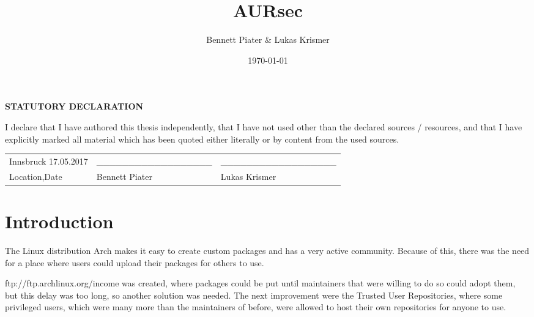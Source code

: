 \documentclass{scrartcl}
\title{AURsec}
\author{Bennett Piater \& Lukas Krismer}
\date{\today}
\begin{document}
  \thispagestyle{empty}

  


  \vspace*{\fill}
  \begin{center} \textbf{\large{STATUTORY DECLARATION}} \end{center}
  I declare that I have authored this thesis independently, that I have not used other than the declared sources  /  resources,  and  that  I  have  explicitly  marked  all  material  which  has  been  quoted  either literally or by content from the used sources. 

  \begin{center} 
  \begin{table}[!htb]
  \begin{tabularx}{\textwidth}{lXX}
  Innsbruck 17.05.2017 & \_\_\_\_\_\_\_\_\_\_\_\_\_\_\_\_\_\_ & \_\_\_\_\_\_\_\_\_\_\_\_\_\_\_\_\_\_ \\ 
  Location,Date & Bennett Piater & Lukas Krismer \\ 

  \end{tabularx}
  \end{table}
  \end{center} 
  \vspace*{\fill}
  \pagebreak


  \begin{abstract}
  \end{abstract}

  \tableofcontents
  \listoffigures
  \listoftables
  \pagebreak



  \section{Introduction}  %
  The Linux distribution Arch makes it easy to create custom packages and has a very active community. Because of this, there was the need for a place where users could upload their packages for others to use.

  ftp://ftp.archlinux.org/income was created, where packages could be put until maintainers that were willing to do so could adopt them, but this delay was too long, so another solution was needed.
  The next improvement were the Trusted User Repositories, where some privileged users, which were many more than the maintainers of before, were allowed to host their own repositories for anyone to use. 
\end{document}
